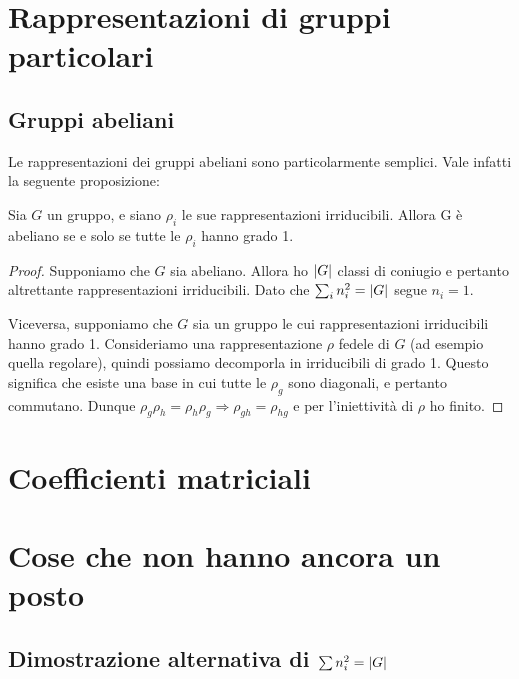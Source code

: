 \documentclass[a4paper,10pt,oneside]{math_article}
\begin{document}
 
  \section{Rappresentazioni di gruppi particolari}
  \subsection{Gruppi abeliani}
   Le rappresentazioni dei gruppi abeliani sono particolarmente semplici. Vale infatti la seguente proposizione:
   \begin{myprop}
    Sia $G$ un gruppo, e siano $\rho_i$ le sue rappresentazioni irriducibili. Allora G è abeliano se e solo se tutte le $\rho_i$ hanno grado 1.
   \end{myprop}
    
   \begin{proof}
    Supponiamo che $G$ sia abeliano. Allora ho $\left|G\right|$ classi di coniugio e pertanto altrettante rappresentazioni irriducibili. Dato che $\sum_i n_i^2 = \left|G\right|$ segue $n_i = 1$.
    
    Viceversa, supponiamo che $G$ sia un gruppo le cui rappresentazioni irriducibili hanno grado 1. Consideriamo una rappresentazione $\rho$ fedele di $G$ (ad esempio quella regolare), quindi possiamo decomporla in irriducibili di grado 1. Questo significa che esiste una base in cui tutte le $\rho_g$ sono diagonali, e pertanto commutano. Dunque $\rho_g\rho_h = \rho_h\rho_g \Rightarrow \rho_{gh} = \rho_{hg}$ e per l'iniettività di $\rho$ ho finito.
   \end{proof}

  
  
 
  \section{Coefficienti matriciali}
 
  \section{Cose che non hanno ancora un posto}
  \subsection{Dimostrazione alternativa di $\sum n_i^2 = \left|G\right|$}

 
\end{document}
